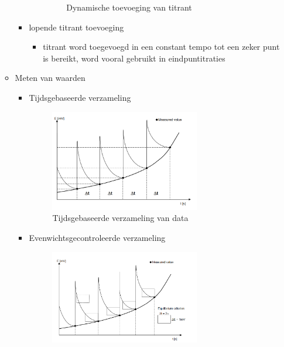 \documentclass[10pt]{report}
\begin{document}
\begin{itemize}
\begin{itemize}
\begin{itemize}
\begin{itemize}
\begin{figure}[h]
                                    \caption{Dynamische toevoeging van titrant}
                                \end{figure}
                        \end{itemize}
                    \item lopende titrant toevoeging
                        \begin{itemize}
                            \item titrant word toegevoegd in een constant tempo tot een zeker punt is bereikt, word vooral gebruikt in eindpuntitraties
                        \end{itemize}
                \end{itemize}
            \newpage
            \item Meten van waarden
                \begin{itemize}
                    \item Tijdsgebaseerde verzameling
                        \begin{figure}[h]
                            \centering
                            \includegraphics[width=0.7\textwidth]{rfpcir4.png}
                            \caption{Tijdsgebaseerde verzameling van data}
                        \end{figure}
                    \item Evenwichtsgecontroleerde verzameling
                        \begin{figure}[h]
                            \centering
                            \includegraphics[width=0.7\textwidth]{rfpcir5.png}

\end{figure}
\end{itemize}
\end{itemize}
\end{itemize}
\end{document}
